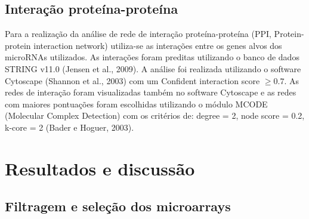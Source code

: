 \documentclass[12pt, a4paper]{article}
\begin{document}
    \subsection{Interação proteína-proteína}
    \par Para a realização da análise de rede de interação proteína-proteína (PPI, Protein-protein interaction network) utiliza-se as interações entre os genes alvos dos microRNAs utilizados. As interações foram preditas utilizando o banco de dados STRING v11.0 (Jensen et al., 2009). A análise foi realizada utilizando o software Cytoscape (Shannon et al., 2003) com um Confident interaction score \(\geq 0.7\). As redes de interação foram visualizadas também no software Cytoscape e as redes com maiores pontuações foram escolhidas utilizando o módulo MCODE (Molecular Complex Detection) com os critérios de: degree = 2, node score = 0.2, k-core = 2 (Bader e Hoguer, 2003).

    \section{Resultados e discussão}
    \subsection{Filtragem e seleção dos microarrays}
\end{document}
